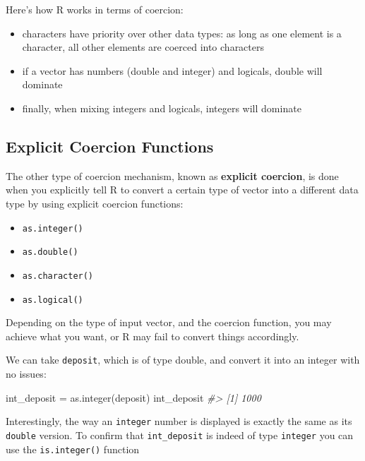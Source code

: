 \documentclass[
]{book}
\newenvironment{Shaded}{\begin{snugshade}}{\end{snugshade}}
\newcommand{\CommentTok}[1]{\textcolor[rgb]{0.56,0.35,0.01}{\textit{#1}}}
\newcommand{\FunctionTok}[1]{\textcolor[rgb]{0.00,0.00,0.00}{#1}}
\newcommand{\NormalTok}[1]{#1}
\newcommand{\OtherTok}[1]{\textcolor[rgb]{0.56,0.35,0.01}{#1}}
\providecommand{\tightlist}{%
  \setlength{\itemsep}{0pt}\setlength{\parskip}{0pt}}
\begin{document}
Here's how R works in terms of coercion:

\begin{itemize}
\item
  characters have priority over other data types: as long as one element is
  a character, all other elements are coerced into characters
\item
  if a vector has numbers (double and integer) and logicals, double will
  dominate
\item
  finally, when mixing integers and logicals, integers will dominate
\end{itemize}

\hypertarget{explicit-coercion-functions}{%
\subsection{Explicit Coercion Functions}\label{explicit-coercion-functions}}

The other type of coercion mechanism, known as \textbf{explicit coercion}, is done
when you explicitly tell R to convert a certain type of vector into a different
data type by using explicit coercion functions:

\begin{itemize}
\tightlist
\item
  \texttt{as.integer()}
\item
  \texttt{as.double()}
\item
  \texttt{as.character()}
\item
  \texttt{as.logical()}
\end{itemize}

Depending on the type of input vector, and the coercion function, you may
achieve what you want, or R may fail to convert things accordingly.

We can take \texttt{deposit}, which is of type double, and convert it into an integer
with no issues:

\begin{Shaded}
\begin{Highlighting}[]
\NormalTok{int\_deposit }\OtherTok{=} \FunctionTok{as.integer}\NormalTok{(deposit)}
\NormalTok{int\_deposit}
\CommentTok{\#\textgreater{} [1] 1000}
\end{Highlighting}
\end{Shaded}

Interestingly, the way an \texttt{integer} number is displayed is exactly the same
as its \texttt{double} version. To confirm that \texttt{int\_deposit} is indeed of type
\texttt{integer} you can use the \texttt{is.integer()} function
\end{document}
